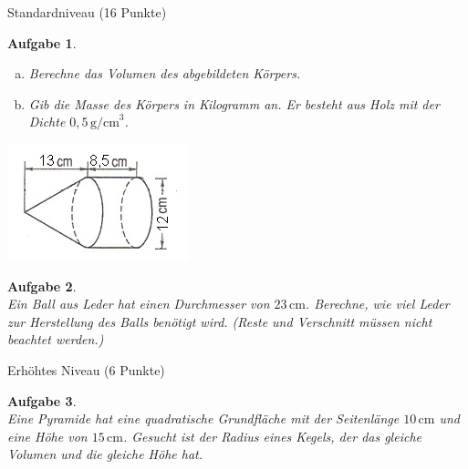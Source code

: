 \documentclass[11pt,fleqn]{article}
\theoremstyle{aufg}
\newtheorem{aufgabe}{Aufgabe}
\theoremstyle{bsp}
\begin{document}
\begin{flushleft}
\begin{center} \begin{framed} Standardniveau (16 Punkte) \end{framed} \end{center}\begin{aufgabe} ~ \\ 
\begin{enumerate}[a)]
\item Berechne das Volumen des abgebildeten K\"orpers.
\item Gib die Masse des K\"orpers in Kilogramm an. Er besteht aus Holz mit der Dichte $0,5\mathrm{\,g/cm}^3$.
\end{enumerate}
\includegraphics{bilder/zylinderkegel.png}
\end{aufgabe} 
\begin{aufgabe} ~ \\ 
Ein Ball aus Leder hat einen Durchmesser von $23\mathrm{\,cm}$. Berechne, wie viel Leder zur Herstellung des Balls ben\"otigt wird. (Reste und Verschnitt m\"ussen nicht beachtet werden.)
\end{aufgabe} 
\begin{center} \begin{framed} Erh\"ohtes Niveau (6 Punkte) \end{framed} \end{center}\begin{aufgabe} ~ \\ 
Eine Pyramide hat eine quadratische Grundfl\"ache mit der Seitenl\"ange $10\mathrm{\,cm}$  und eine H\"ohe von $15\mathrm{\,cm}$. Gesucht ist der Radius eines Kegels, der das gleiche Volumen und die gleiche H\"ohe hat.
\end{aufgabe} 
\end{flushleft} 
    
\end{document}
